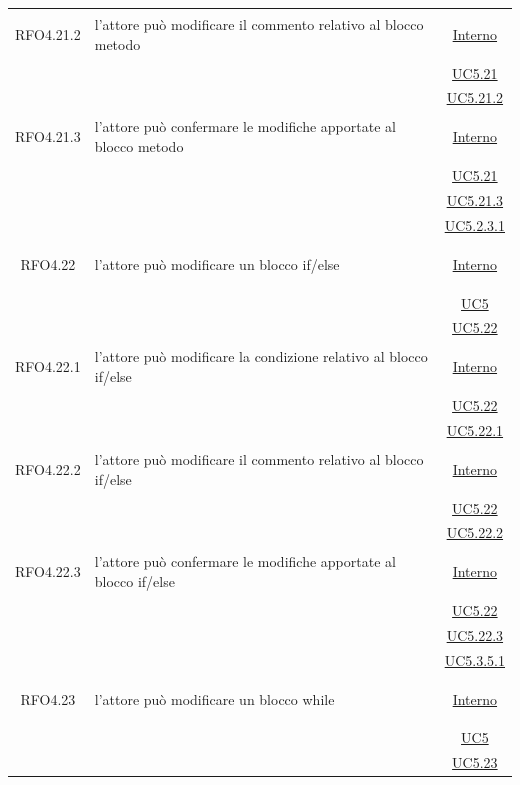 \begin{longtable}{|c|>{\centering}m{7cm}|c|}
\hypertarget{RFO4.21.2}{RFO4.21.2} & l'attore può modificare il commento relativo al blocco metodo &  \hyperlink{Interno}{Interno}\\
& &\hyperref[UC5.21]{UC5.21}\\
& &\hyperref[UC5.21.2]{UC5.21.2}\\ \hline

\hypertarget{RFO4.21.3}{RFO4.21.3} & l'attore può confermare le modifiche apportate al blocco metodo &  \hyperlink{Interno}{Interno}\\
& &\hyperref[UC5.21]{UC5.21}\\
& &\hyperref[UC5.21.3]{UC5.21.3}\\
& &\hyperref[UC5.2.3.1]{UC5.2.3.1}\\ \hline

\hypertarget{RFO4.22}{RFO4.22} & l'attore può modificare un blocco if/else &  \hyperlink{Interno}{Interno}\\
& &\hyperref[UC5]{UC5}\\
& &\hyperref[UC5.22]{UC5.22}\\ \hline

\hypertarget{RFO4.22.1}{RFO4.22.1} & l'attore può modificare la condizione relativo al blocco if/else &  \hyperlink{Interno}{Interno}\\
& &\hyperref[UC5.22]{UC5.22}\\
& &\hyperref[UC5.22.1]{UC5.22.1}\\ \hline

\hypertarget{RFO4.22.2}{RFO4.22.2} & l'attore può modificare il commento relativo al blocco if/else &  \hyperlink{Interno}{Interno}\\
& &\hyperref[UC5.22]{UC5.22}\\
& &\hyperref[UC5.22.2]{UC5.22.2}\\ \hline

\hypertarget{RFO4.22.3}{RFO4.22.3} & l'attore può confermare le modifiche apportate al blocco if/else &  \hyperlink{Interno}{Interno}\\
& &\hyperref[UC5.22]{UC5.22}\\
& &\hyperref[UC5.22.3]{UC5.22.3}\\
& &\hyperref[UC5.3.5.1]{UC5.3.5.1}\\ \hline

\hypertarget{RFO4.23}{RFO4.23} & l'attore può modificare un blocco while &  \hyperlink{Interno}{Interno}\\
& &\hyperref[UC5]{UC5}\\
& &\hyperref[UC5.23]{UC5.23}\\ \hline


\end{longtable}
